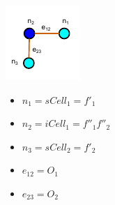 \begin{minipage}[h]{0.68\linewidth} 
\begin{minipage}[h]{0.4\linewidth} 
\includegraphics[width=0.8\linewidth]{../Common/images/FeatureInteractionGraph.pdf}
\label{fig_featgraph}
\end{minipage}
\hfill
\begin{minipage}[h]{0.4\linewidth} 
\begin{itemize}[noitemsep,topsep=2pt,parsep=2pt,partopsep=2pt,label={}]
\item $n_1 = sCell_1= f'_1$
\item $n_2 = iCell_1 = f''_1f''_2$
\item $n_3 = sCell_2 = f'_2$
\item $e_{12} = O_1$
\item $e_{23}= O_2$
\end{itemize}
\end{minipage}
\end{minipage}

